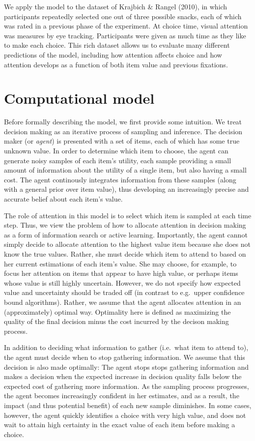 \documentclass[12pt,a4paperpaper,]{article}
\begin{document}
We apply the model to the dataset of Krajbich \& Rangel (2010), in which participants repeatedly selected one out of three possible snacks, each of which was rated in a previous phase of the experiment. At choice time, visual attention was measures by eye tracking. Participants were given as much time as they like to make each choice. This rich dataset allows us to evaluate many different predictions of the model, including how attention affects choice and how attention develops as a function of both item value and previous fixations.

\section{Computational model}\label{computational-model}

Before formally describing the model, we first provide some intuition. We treat decision making as an iterative process of sampling and inference. The decision maker (or \emph{agent}) is presented with a set of items, each of which has some true unknown value. In order to determine which item to choose, the agent can generate noisy samples of each item's utility, each sample providing a small amount of information about the utility of a single item, but also having a small cost. The agent continously integrates information from these samples (along with a general prior over item value), thus developing an increasingly precise and accurate belief about each item's value.

The role of attention in this model is to select which item is sampled at each time step. Thus, we view the problem of how to allocate attention in decision making as a form of information search or active learning. Importantly, the agent cannot simply decide to allocate attention to the highest value item because she does not know the true values. Rather, she must decide which item to attend to based on her current estimations of each item's value. She may choose, for example, to focus her attention on items that appear to have high value, or perhaps items whose value is still highly uncertain. However, we do not specify how expected value and uncertainty should be traded off (in contrast to e.g.~upper confidence bound algorithms). Rather, we assume that the agent allocates attention in an (approximately) optimal way. Optimality here is defined as maximizing the quality of the final decision minus the cost incurred by the decison making process.

In addition to deciding what information to gather (i.e.~what item to attend to), the agent must decide when to stop gathering information. We assume that this decision is also made optimally: The agent stops stops gathering information and makes a decision when the expected increase in decision quality falls below the expected cost of gathering more information. As the sampling process progresses, the agent becomes increasingly confident in her estimates, and as a result, the impact (and thus potential benefit) of each new sample diminishes. In some cases, however, the agent quickly identifies a choice with very high value, and does not wait to attain high certainty in the exact value of each item before making a choice.
\end{document}
